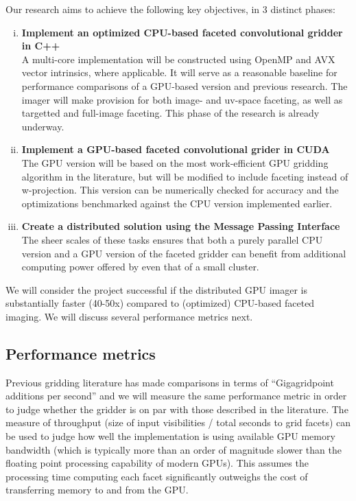 \documentclass[a4paper, two column]{article}
\begin{document}
Our research aims to achieve the following key objectives, in 3 distinct phases:
\begin{enumerate}[i)]
 \item \textbf{Implement an optimized CPU-based faceted convolutional gridder in C++}\\
  A multi-core implementation will be constructed using OpenMP and AVX vector intrinsics, where applicable. It will serve as a reasonable baseline for performance 
  comparisons of a GPU-based version and previous research. The imager will make provision for both image- and uv-space faceting, as well as targetted and full-image faceting. This phase of the 
  research is already underway.
 \item \textbf{Implement a GPU-based faceted convolutional grider in CUDA}\\
  The GPU version will be based on the most work-efficient GPU gridding algorithm in the literature, but will be modified to include faceting instead of w-projection. This version
  can be numerically checked for accuracy and the optimizations benchmarked against the CPU version implemented earlier.
 \item \textbf{Create a distributed solution using the Message Passing Interface}\\
  The sheer scales of these tasks ensures that both a purely parallel CPU version and a GPU version of the faceted gridder can benefit from additional computing power offered by even that of a small cluster.
\end{enumerate}

We will consider the project successful if the distributed GPU imager is substantially faster (40-50x) compared to (optimized) CPU-based faceted imaging. We will discuss several performance metrics next.

\subsection{Performance metrics}
Previous gridding literature \cite{muscat2014high,romein2012efficient} has made comparisons in terms of ``Gigagridpoint additions per second'' and we will measure the same performance metric in order to judge 
whether the gridder is on par with those described in the literature. The measure of throughput (size of input visibilities / total seconds to grid facets) can be used to judge how well the implementation is 
using available GPU memory bandwidth (which is typically more than an order of magnitude slower than the floating point processing capability of modern GPUs). This assumes the processing time computing each 
facet significantly outweighs the cost of transferring memory to and from the GPU.
\end{document}
